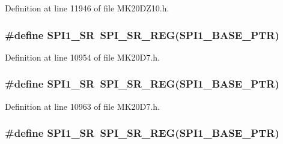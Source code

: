 Definition at line 11946 of file M\+K20\+D\+Z10.\+h.

\subsubsection[{\texorpdfstring{S\+P\+I1\+\_\+\+SR}{SPI1_SR}}]{\setlength{\rightskip}{0pt plus 5cm}\#define S\+P\+I1\+\_\+\+SR~{\bf S\+P\+I\+\_\+\+S\+R\+\_\+\+R\+EG}({\bf S\+P\+I1\+\_\+\+B\+A\+S\+E\+\_\+\+P\+TR})}\hypertarget{group___s_p_i___register___accessor___macros_ga2b19fcaa36c268e02998a7719d021bac}{}\label{group___s_p_i___register___accessor___macros_ga2b19fcaa36c268e02998a7719d021bac}


Definition at line 10954 of file M\+K20\+D7.\+h.

\subsubsection[{\texorpdfstring{S\+P\+I1\+\_\+\+SR}{SPI1_SR}}]{\setlength{\rightskip}{0pt plus 5cm}\#define S\+P\+I1\+\_\+\+SR~{\bf S\+P\+I\+\_\+\+S\+R\+\_\+\+R\+EG}({\bf S\+P\+I1\+\_\+\+B\+A\+S\+E\+\_\+\+P\+TR})}\hypertarget{group___s_p_i___register___accessor___macros_ga2b19fcaa36c268e02998a7719d021bac}{}\label{group___s_p_i___register___accessor___macros_ga2b19fcaa36c268e02998a7719d021bac}


Definition at line 10963 of file M\+K20\+D7.\+h.

\subsubsection[{\texorpdfstring{S\+P\+I1\+\_\+\+SR}{SPI1_SR}}]{\setlength{\rightskip}{0pt plus 5cm}\#define S\+P\+I1\+\_\+\+SR~{\bf S\+P\+I\+\_\+\+S\+R\+\_\+\+R\+EG}({\bf S\+P\+I1\+\_\+\+B\+A\+S\+E\+\_\+\+P\+TR})}\hypertarget{group___s_p_i___register___accessor___macros_ga2b19fcaa36c268e02998a7719d021bac}{}\label{group___s_p_i___register___accessor___macros_ga2b19fcaa36c268e02998a7719d021bac}



